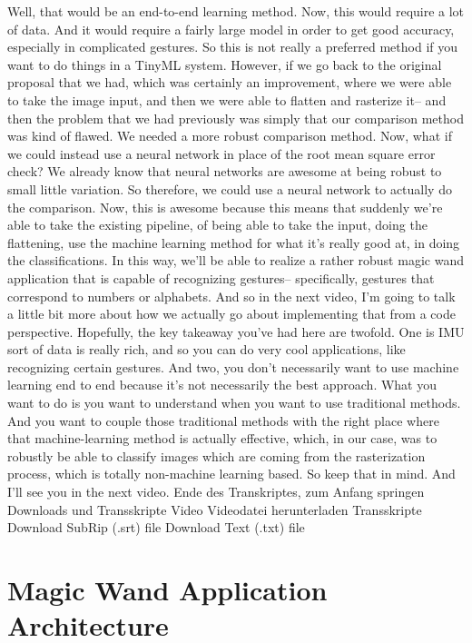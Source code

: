     Well, that would be an end-to-end learning method.
    Now, this would require a lot of data.
    And it would require a fairly large model
    in order to get good accuracy, especially in complicated gestures.
    So this is not really a preferred method if you
    want to do things in a TinyML system.
    However, if we go back to the original proposal that we had,
    which was certainly an improvement, where
    we were able to take the image input, and then we
    were able to flatten and rasterize it-- and then
    the problem that we had previously was simply that our comparison
    method was kind of flawed.
    We needed a more robust comparison method.
    Now, what if we could instead use a neural network in place of the root
    mean square error check?
    We already know that neural networks are awesome at being
    robust to small little variation.
    So therefore, we could use a neural network to actually do the comparison.
    Now, this is awesome because this means that suddenly we're
    able to take the existing pipeline, of being able to take the input,
    doing the flattening, use the machine learning method
    for what it's really good at, in doing the classifications.
    In this way, we'll be able to realize a rather robust magic wand
    application that is capable of recognizing gestures--
    specifically, gestures that correspond to numbers or alphabets.
    And so in the next video, I'm going to talk a little bit more
    about how we actually go about implementing that
    from a code perspective.
    Hopefully, the key takeaway you've had here are twofold.
    One is IMU sort of data is really rich, and so you
    can do very cool applications, like recognizing certain gestures.
    And two, you don't necessarily want to use
    machine learning end to end because it's not necessarily the best approach.
    What you want to do is you want to understand when
    you want to use traditional methods.
    And you want to couple those traditional methods
    with the right place where that machine-learning method is actually
    effective, which, in our case, was to robustly
    be able to classify images which are coming from the rasterization
    process, which is totally non-machine learning based.
    So keep that in mind.
    And I'll see you in the next video.
    Ende des Transkriptes, zum Anfang springen
    Downloads und Transskripte
    Video
    Videodatei herunterladen
    Transskripte
    Download SubRip (.srt) file
    Download Text (.txt) file    

\section{Magic Wand Application Architecture}

